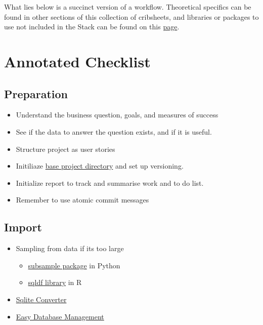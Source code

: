 \documentclass[]{book}
\providecommand{\tightlist}{%
  \setlength{\itemsep}{0pt}\setlength{\parskip}{0pt}}
\theoremstyle{definition}
\theoremstyle{definition}
\theoremstyle{definition}
\theoremstyle{remark}
\begin{document}
What lies below is a succinct version of a workflow. Theoretical
specifics can be found in other sections of this collection of
cribsheets, and libraries or packages to use not included in the Stack
can be found on this
\href{https://gfleetwood.github.io/noted-resources/data_science.html}{page}.

\section{Annotated Checklist}\label{annotated-checklist}

\subsection{Preparation}\label{preparation}

\begin{itemize}
\item
  Understand the business question, goals, and measures of success
\item
  See if the data to answer the question exists, and if it is useful.
\item
  Structure project as user stories
\item
  Initiliaze
  \href{https://github.com/gfleetwood/ds-crib-sheet/blob/master/other/setup_project.R}{base
  project directory} and set up versioning.
\item
  Initialize report to track and summarise work and to do list.
\item
  Remember to use atomic commit messages
\end{itemize}

\subsection{Import}\label{import}

\begin{itemize}
\item
  Sampling from data if its too large

  \begin{itemize}
  \tightlist
  \item
    \href{https://pypi.python.org/pypi/subsample}{subsample package} in
    Python
  \item
    \href{https://stackoverflow.com/a/22262726/6627726}{sqldf library}
    in R
  \end{itemize}
\item
  \href{https://github.com/thombashi/sqlitebiter}{Sqlite Converter}
\item
  \href{https://dataset.readthedocs.io/en/latest/}{Easy Database
  Management}
\end{itemize}
\end{document}
